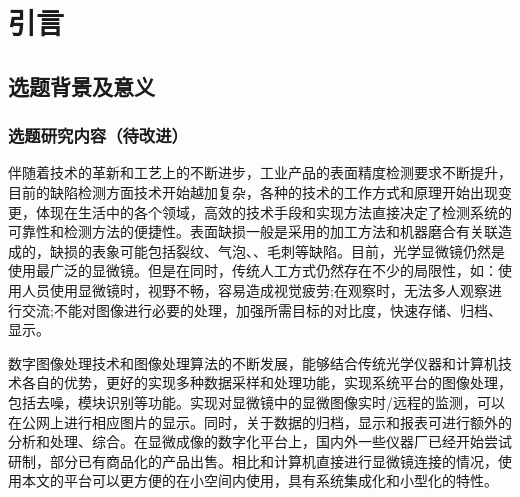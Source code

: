{\tiny {\tiny }}\chapter{引言}
\section{选题背景及意义}
\subsection{选题研究内容（待改进）}
伴随着技术的革新和工艺上的不断进步，工业产品的表面精度检测要求不断提升，目前的缺陷检测方面技术开始越加复杂，各种的技术的工作方式和原理开始出现变更，体现在生活中的各个领域，高效的技术手段和实现方法直接决定了检测系统的可靠性和检测方法的便捷性。表面缺损一般是采用的加工方法和机器磨合有关联造成的，缺损的表象可能包括裂纹、气泡、、毛刺等缺陷。目前，光学显微镜仍然是使用最广泛的显微镜。但是在同时，传统人工方式仍然存在不少的局限性，如：使用人员使用显微镜时，视野不畅，容易造成视觉疲劳;在观察时，无法多人观察进行交流;不能对图像进行必要的处理，加强所需目标的对比度，快速存储、归档、显示。

数字图像处理技术和图像处理算法的不断发展，能够结合传统光学仪器和计算机技术各自的优势，更好的实现多种数据采样和处理功能，实现系统平台的图像处理，包括去噪，模块识别等功能。实现对显微镜中的显微图像实时/远程的监测，可以在公网上进行相应图片的显示。同时，关于数据的归档，显示和报表可进行额外的分析和处理、综合。在显微成像的数字化平台上，国内外一些仪器厂已经开始尝试研制，部分已有商品化的产品出售。相比和计算机直接进行显微镜连接的情况，使用本文的平台可以更方便的在小空间内使用，具有系统集成化和小型化的特性。\cite{machine}\cite{light3D}\cite{eletnature}


